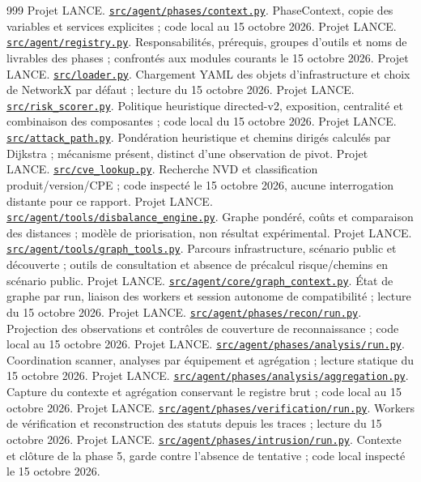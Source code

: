 \documentclass[11pt,a4paper]{article}
\newcommand{\source}[2]{\href{../../#1}{\nolinkurl{#1}}. #2}
\begin{document}
\begin{thebibliography}{999}
 Projet LANCE. \source{src/agent/phases/context.py}{PhaseContext, copie des variables et services explicites ; code local au 15 octobre 2026.}
 Projet LANCE. \source{src/agent/registry.py}{Responsabilités, prérequis, groupes d’outils et noms de livrables des phases ; confrontés aux modules courants le 15 octobre 2026.}
 Projet LANCE. \source{src/loader.py}{Chargement YAML des objets d’infrastructure et choix de NetworkX par défaut ; lecture du 15 octobre 2026.}
 Projet LANCE. \source{src/risk_scorer.py}{Politique heuristique directed-v2, exposition, centralité et combinaison des composantes ; code local du 15 octobre 2026.}
 Projet LANCE. \source{src/attack_path.py}{Pondération heuristique et chemins dirigés calculés par Dijkstra ; mécanisme présent, distinct d’une observation de pivot.}
 Projet LANCE. \source{src/cve_lookup.py}{Recherche NVD et classification produit/version/CPE ; code inspecté le 15 octobre 2026, aucune interrogation distante pour ce rapport.}
 Projet LANCE. \source{src/agent/tools/disbalance_engine.py}{Graphe pondéré, coûts et comparaison des distances ; modèle de priorisation, non résultat expérimental.}
 Projet LANCE. \source{src/agent/tools/graph_tools.py}{Parcours infrastructure, scénario public et découverte ; outils de consultation et absence de précalcul risque/chemins en scénario public.}
 Projet LANCE. \source{src/agent/core/graph_context.py}{État de graphe par run, liaison des workers et session autonome de compatibilité ; lecture du 15 octobre 2026.}
 Projet LANCE. \source{src/agent/phases/recon/run.py}{Projection des observations et contrôles de couverture de reconnaissance ; code local au 15 octobre 2026.}
 Projet LANCE. \source{src/agent/phases/analysis/run.py}{Coordination scanner, analyses par équipement et agrégation ; lecture statique du 15 octobre 2026.}
 Projet LANCE. \source{src/agent/phases/analysis/aggregation.py}{Capture du contexte et agrégation conservant le registre brut ; code local au 15 octobre 2026.}
 Projet LANCE. \source{src/agent/phases/verification/run.py}{Workers de vérification et reconstruction des statuts depuis les traces ; lecture du 15 octobre 2026.}
 Projet LANCE. \source{src/agent/phases/intrusion/run.py}{Contexte et clôture de la phase 5, garde contre l’absence de tentative ; code local inspecté le 15 octobre 2026.}

\end{thebibliography}
\end{document}
